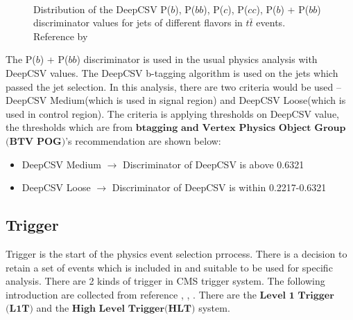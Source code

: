 			\FloatBarrier
			\begin{figure}[H]
			\centering
			    \\
			\caption{Distribution of the DeepCSV P($b$), P($bb$), P($c$), P($cc$), P($b$) + P($bb$) discriminator values for jets of different flavors in $t\bar{t}$ events. Reference by \cite{CMS-BTV-16-002}}
			\label{PhysObj:fig:flavor_discr}
			\end{figure}
			\FloatBarrier

			The P($b$) + P($bb$) discriminator is used in the usual physics analysis with DeepCSV values. The DeepCSV b-tagging algorithm is used on the jets which passed the jet selection. In this analysis, there are two criteria would be used -- DeepCSV Medium(which is used in signal region) and DeepCSV Loose(which is used in control region). The criteria is applying thresholds on DeepCSV value, the thresholds which are from $\textbf{btagging}$ $\textbf{and}$ $\textbf{Vertex}$ $\textbf{Physics}$ $\textbf{Object}$ $\textbf{Group}$$\textbf{(BTV POG)}$'s\cite{btvpog_twiki} recommendation\cite{btagrecommendation_twiki} are shown below:

			\begin{itemize}
				\item DeepCSV Medium $\rightarrow$ Discriminator of DeepCSV is above 0.6321
				\item DeepCSV Loose $\rightarrow$ Discriminator of DeepCSV is within 0.2217-0.6321
			\label{PhysObj:itm:btag}
			\end{itemize}

	\subsection{Trigger}
	\label{ssec:PhysObj_trg}
		Trigger is the start of the physics event selection prrocess. There is a decision to retain a set of events which is included in and suitable to be used for specific analysis. There are 2 kinds of trigger in CMS trigger system. The following introduction are collected from reference \cite{Dasu:2000ge}, \cite{Cadamuro_2017}, \cite{Trocino_2014} . There are the $\textbf{Level}$ $\textbf{1}$ $\textbf{Trigger}$$\textbf{(L1T)}$ and the $\textbf{High}$ $\textbf{Level}$ $\textbf{Trigger}$$\textbf{(HLT)}$ system.

